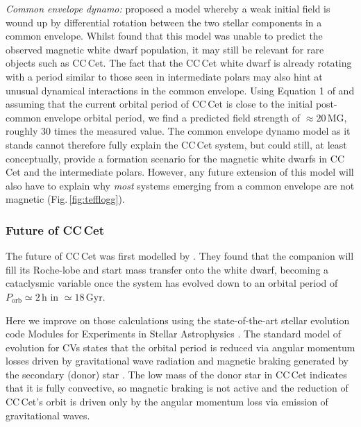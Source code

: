 \documentclass[fleqn,usenatbib]{mnras}
\begin{document}
\textit{Common envelope dynamo:} \citet{briggsetal18-1} proposed a model whereby a weak initial field is wound up by differential rotation between the two stellar components in a common envelope. Whilst \citet{bellonietal20-1} found that this model was unable to predict the observed magnetic white dwarf population, it may still be relevant for rare objects such as CC\,Cet. The fact that the CC\,Cet white dwarf is already rotating with a period similar to those seen in intermediate polars may also hint at unusual dynamical interactions in the common envelope. Using Equation 1 of \citet{briggsetal18-1} and assuming that the current orbital period of CC\,Cet is close to the initial post-common envelope orbital period, we find a predicted field strength of $\approx20 $\,MG, roughly 30 times the measured value. The common envelope dynamo model as it stands cannot therefore fully explain the CC\,Cet system, but could still, at least conceptually, provide a formation scenario for the magnetic white dwarfs in CC\,Cet and the intermediate polars. However, any future extension of this model will also have to explain why \textit{most} systems emerging from a common envelope are not magnetic (Fig.\,\ref{fig:tefflogg}).

\subsubsection{Future of CC\,Cet}
\label{sec:future}

The future of CC\,Cet was first modelled by \citet{schreiber+gaensicke03-1}. They found that the companion will fill its Roche-lobe and start mass transfer onto the white dwarf, becoming a cataclysmic variable once the system has evolved down to an orbital period of $P_\mathrm{orb}\simeq2$\,h in $\simeq18$\,Gyr. 

Here we improve on those calculations using the state-of-the-art stellar evolution code Modules for Experiments in Stellar Astrophysics  \citep[{\tt MESA} v.12778,][]{paxtonetal11-1, paxtonetal13-1, paxtonetal15-1, paxtonetal18-1, paxtonetal19-1}. The standard model of evolution for CVs states that the orbital period is reduced via angular momentum losses driven by gravitational wave radiation \citep{paczynski67-1} and magnetic braking generated by the secondary (donor) star \citep{verbunt+zwaan81-1, rappaportetal83-1, mestel+spruit87-1, kawaler88-1, andronovetal03-1}. The low mass of the donor star in CC\,Cet indicates that it is fully convective, so magnetic braking is not active and the reduction of CC\,Cet's orbit is driven only by the angular momentum loss via emission of gravitational waves.
\end{document}
